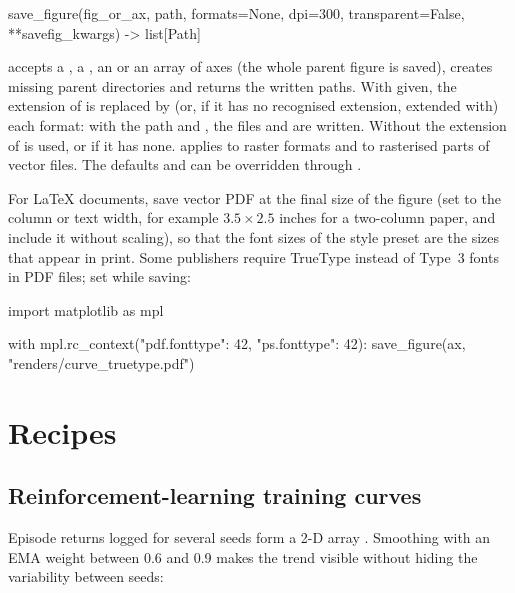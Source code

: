 \begin{pycode}
save_figure(fig_or_ax, path, formats=None, dpi=300, transparent=False,
            **savefig_kwargs) -> list[Path]
\end{pycode}

 accepts a , a , an
 or an array of axes (the whole parent figure is saved), creates
missing parent directories and returns the written paths. With
 given, the extension of  is replaced by (or, if it
has no recognised extension, extended with) each format: with the path
 and , the files
 and  are written. Without
 the extension of  is used, or
 if it has none.  applies to raster
formats and to rasterised parts of vector files. The defaults
 and  can be overridden
through .

For LaTeX documents, save vector PDF at the final size of the figure (set
 to the column or text width, for example $3.5 \times 2.5$
inches for a two-column paper, and include it without scaling), so that the
font sizes of the style preset are the sizes that appear in print. Some
publishers require TrueType instead of Type~3 fonts in PDF files; set
 while saving:

\begin{pycode}
import matplotlib as mpl

with mpl.rc_context({"pdf.fonttype": 42, "ps.fonttype": 42}):
    save_figure(ax, "renders/curve_truetype.pdf")
\end{pycode}

\section{Recipes}\label{sec:plotkit-recipes}

\subsection{Reinforcement-learning training curves}

Episode returns logged for several seeds form a 2-D array
. Smoothing with an EMA weight between 0.6 and
0.9 makes the trend visible without hiding the variability between seeds:

